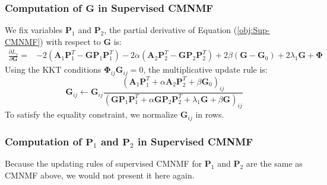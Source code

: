 \documentclass{bmcart}
\begin{document}
\subsubsection*{\textbf{Computation of $\bm{G}$ in Supervised CMNMF}}
We fix variables $\bm{P}_1$ and $\bm{P}_2$,
the partial derivative of Equation (\ref{obj:Sup-CMNMF}) with respect to $\bm{G}$ is:
\begin{equation}\label{equ:G_gradient}\nonumber
\begin{split}
\frac{\partial{L_s}}{\partial{\bm{G}}}=
&-2(\bm{A}_1{\bm{P}_1^T} - \bm{G}{\bm{P}_1}{\bm{P}_1^T})-2\alpha(\bm{A}_2{\bm{P}_2^T} - \bm{G}{\bm{P}_2}{\bm{P}_2^T})+2\beta(\bm{G}-\bm{G}_0)+2\lambda_1\bm{G}+\bm{\Phi}
\end{split}
\end{equation}
Using the KKT conditions $\bm{\Phi}_{ij}\bm{G}_{ij}=0$, the multiplicative update rule is:
\begin{equation}\label{equ:updating_G}\nonumber
\bm{G}_{ij}\leftarrow \bm{G}_{ij}
\frac{(\bm{A}_1\bm{P}_1^T+\alpha \bm{A}_2\bm{P}_2^T+\beta \bm{G}_0)_{ij}}
{(\bm{GP}_1\bm{P}_1^T+\alpha \bm{GP}_2\bm{P}_2^T+\lambda_1\bm{G}+\beta \bm{G})_{ij}}
\end{equation}
To satisfy the equality constraint, we normalize $\bm{G}_{ij}$ in rows.

\subsubsection*{\textbf{Computation of $\bm{P}_1$ and $\bm{P}_2$ in Supervised CMNMF}}
Because the updating rules of supervised CMNMF for $\bm{P}_1$ and $\bm{P}_2$ are the same as CMNMF above, we would not present it here again.
\end{document}
